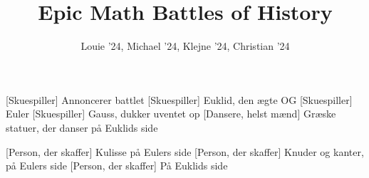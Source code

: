 \documentclass[a4paper,11pt]{article}
\title{Epic Math Battles of History}
\author{Louie '24, Michael '24, Klejne '24, Christian '24}
\begin{document}
\maketitle

\begin{roles}
[Skuespiller] Annoncerer battlet
[Skuespiller] Euklid, den ægte OG
[Skuespiller] Euler
[Skuespiller] Gauss, dukker uventet op
[Dansere, helst mænd] Græske statuer, der danser på Euklids side
\end{roles}

\begin{props}
[Person, der skaffer] Kulisse på Eulers side
[Person, der skaffer] Knuder og kanter, på Eulers side
[Person, der skaffer] På Euklids side
\end{props}

\end{document}
